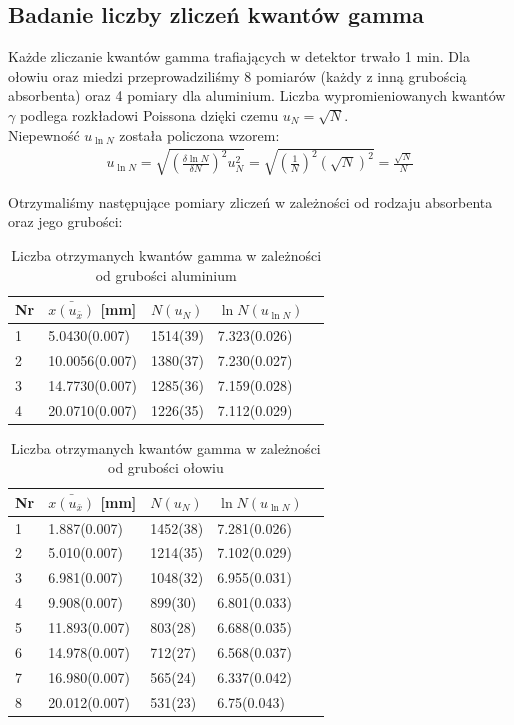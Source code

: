 \documentclass[a4paper]{article}
\begin{document}
\subsection{Badanie liczby zliczeń kwantów gamma}
Każde zliczanie kwantów gamma trafiających w detektor trwało 1 min. Dla ołowiu oraz miedzi przeprowadziliśmy 8 pomiarów (każdy z inną grubością absorbenta) oraz 4 pomiary dla aluminium.
Liczba wypromieniowanych kwantów $\gamma$ podlega rozkładowi Poissona dzięki czemu $u_N=\sqrt{N}$.\\
Niepewność $u_{\ln{N}}$ została policzona wzorem:
\begin{align*}
u_{\ln{N}} = \sqrt{(\frac{\delta \ln{N}}{\delta N})^2 u^2_N} = \sqrt{(\frac{1}{N})^2(\sqrt{N})^2} = \frac{\sqrt{N}}{N}
\end{align*}

Otrzymaliśmy następujące pomiary zliczeń w zależności od rodzaju absorbenta oraz jego grubości:\\
\begin{table}[h!]
\centering
\begin{tabular}{ | l | l | l | l | l | }
\hline
Nr & $\bar{x(u_{\bar{x}})}$ [mm] & $N(u_N)$ & $\ln{N}(u_{\ln{N}})$ \\ \hline
1 & 5.0430(0.007) & 1514(39) & 7.323(0.026)  \\ \hline
2 & 10.0056(0.007) & 1380(37) & 7.230(0.027)  \\ \hline
3 & 14.7730(0.007) & 1285(36) & 7.159(0.028) \\ \hline
4 & 20.0710(0.007) & 1226(35) & 7.112(0.029) \\ \hline
\end{tabular}
\caption{Liczba otrzymanych kwantów gamma w zależności od grubości aluminium}
\label{pomiary_sruba}
\end{table}



\begin{table}[h!]
\centering
\begin{tabular}{ | l | l | l | l | l | }
\hline
Nr & $\bar{x(u_{\bar{x}})}$ [mm] & $N(u_N)$ & $\ln{N}(u_{\ln{N}})$ \\ \hline
1 & 1.887(0.007) & 1452(38) & 7.281(0.026)  \\ \hline
2 & 5.010(0.007) & 1214(35) & 7.102(0.029)  \\ \hline
3 & 6.981(0.007) & 1048(32) & 6.955(0.031) \\ \hline
4 & 9.908(0.007) & 899(30) & 6.801(0.033) \\ \hline
5 & 11.893(0.007) & 803(28) & 6.688(0.035) \\ \hline
6 & 14.978(0.007) & 712(27) & 6.568(0.037) \\ \hline
7 & 16.980(0.007) & 565(24) & 6.337(0.042) \\ \hline
8 & 20.012(0.007) & 531(23) & 6.75(0.043) \\ \hline   
\end{tabular}
\caption{Liczba otrzymanych kwantów gamma w zależności od grubości ołowiu}
\label{pomiary_sruba}
\end{table}
\end{document}
